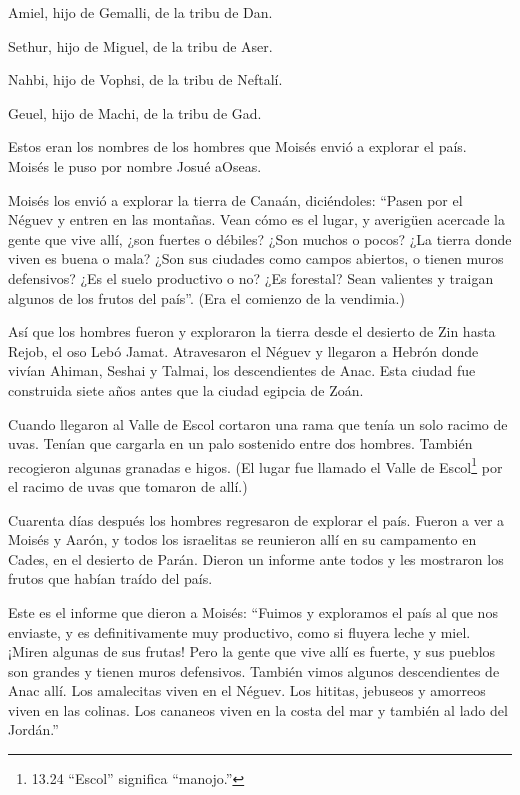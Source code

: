  Amiel, hijo de Gemalli, de la tribu de Dan.

 Sethur, hijo de Miguel, de la tribu de Aser.

 Nahbi, hijo de Vophsi, de la tribu de Neftalí.

 Geuel, hijo de Machi, de la tribu de Gad.

 Estos eran los nombres de los hombres que Moisés envió a
explorar el país. Moisés le puso por nombre Josué aOseas.

 Moisés los envió a explorar la tierra de Canaán,
diciéndoles: ``Pasen por el Néguev y entren en las montañas.
 Vean cómo es el lugar, y averigüen acercade la gente que
vive allí, ¿son fuertes o débiles? ¿Son muchos o pocos? 
¿La tierra donde viven es buena o mala? ¿Son sus ciudades como campos
abiertos, o tienen muros defensivos?  ¿Es el suelo
productivo o no? ¿Es forestal? Sean valientes y traigan algunos de los
frutos del país''. (Era el comienzo de la vendimia.)

 Así que los hombres fueron y exploraron la tierra desde el
desierto de Zin hasta Rejob, el oso Lebó Jamat. 
Atravesaron el Néguev y llegaron a Hebrón donde vivían Ahiman, Seshai y
Talmai, los descendientes de Anac. Esta ciudad fue construida siete años
antes que la ciudad egipcia de Zoán.

 Cuando llegaron al Valle de Escol cortaron una rama que
tenía un solo racimo de uvas. Tenían que cargarla en un palo sostenido
entre dos hombres. También recogieron algunas granadas e higos.
 (El lugar fue llamado el Valle de Escol\footnote{13.24
  ``Escol'' significa ``manojo.''} por el racimo de uvas que tomaron de
allí.)

 Cuarenta días después los hombres regresaron de explorar
el país.  Fueron a ver a Moisés y Aarón, y todos los
israelitas se reunieron allí en su campamento en Cades, en el desierto
de Parán. Dieron un informe ante todos y les mostraron los frutos que
habían traído del país.

 Este es el informe que dieron a Moisés: ``Fuimos y
exploramos el país al que nos enviaste, y es definitivamente muy
productivo, como si fluyera leche y miel. ¡Miren algunas de sus frutas!
 Pero la gente que vive allí es fuerte, y sus pueblos son
grandes y tienen muros defensivos. También vimos algunos descendientes
de Anac allí.  Los amalecitas viven en el Néguev. Los
hititas, jebuseos y amorreos viven en las colinas. Los cananeos viven en
la costa del mar y también al lado del Jordán.''

